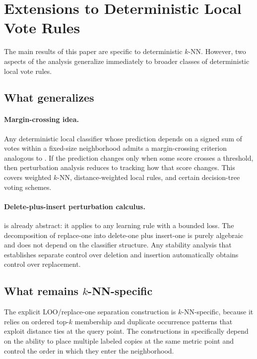 \section{Extensions to Deterministic Local Vote Rules}
\label{sec:extensions}

The main results of this paper are specific to deterministic $k$-NN.  However,
two aspects of the analysis generalize immediately to broader classes of
deterministic local vote rules.

\subsection{What generalizes}

\paragraph{Margin-crossing idea.}
Any deterministic local classifier whose prediction depends on a signed sum of
votes within a fixed-size neighborhood admits a margin-crossing criterion
analogous to .  If the prediction changes only when some
score crosses a threshold, then perturbation analysis reduces to tracking how
that score changes.  This covers weighted $k$-NN, distance-weighted local rules,
and certain decision-tree voting schemes.

\paragraph{Delete-plus-insert perturbation calculus.}
 is already abstract: it applies to any learning rule with a
bounded loss.  The decomposition of replace-one into delete-one plus insert-one
is purely algebraic and does not depend on the classifier structure.  Any
stability analysis that establishes separate control over deletion and insertion
automatically obtains control over replacement.

\subsection{What remains $k$-NN-specific}

The explicit LOO/replace-one separation construction is $k$-NN-specific,
because it relies on ordered top-$k$ membership and duplicate occurrence
patterns that exploit distance ties at the query point.  The constructions in
 specifically depend on the
ability to place multiple labeled copies at the same metric point and control
the order in which they enter the neighborhood.

